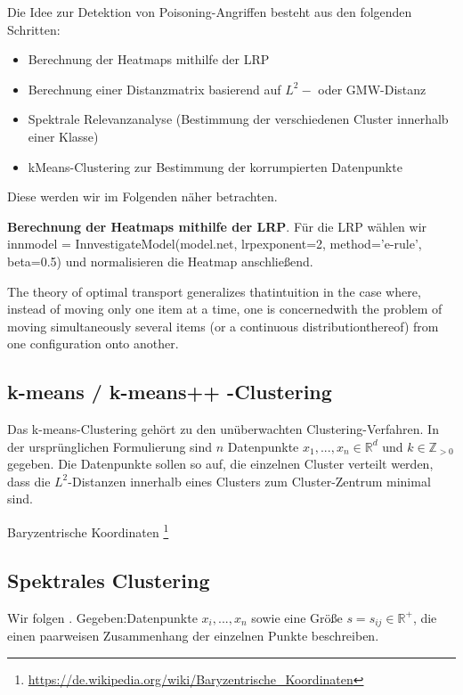 \documentclass[11pt,a4paper]{article}
\numberwithin{equation}{section}
\begin{document}
	Die Idee zur Detektion von Poisoning-Angriffen besteht aus den folgenden Schritten:
	
	\begin{itemize}
		\item Berechnung der Heatmaps mithilfe der LRP
		\item Berechnung einer Distanzmatrix basierend auf $L^2-$ oder GMW-Distanz
		\item Spektrale Relevanzanalyse (Bestimmung der verschiedenen Cluster innerhalb einer Klasse)
		\item kMeans-Clustering zur Bestimmung der korrumpierten Datenpunkte
	\end{itemize}

	Diese werden wir im Folgenden näher betrachten.
	
	\noindent\textbf{Berechnung der Heatmaps mithilfe der LRP}.	Für die LRP wählen wir innmodel = InnvestigateModel(model.net, lrpexponent=2,
	method='e-rule', beta=0.5) und normalisieren die Heatmap anschließend.
	
	
	
	The theory of optimal transport generalizes thatintuition in the case where, instead of moving only one item at a time, one is concernedwith the problem of moving simultaneously several items (or a continuous distributionthereof) from one configuration onto another.\cite{computationalOT}
	\subsection{k-means / k-means++ -Clustering}
	Das k-means-Clustering gehört zu den unüberwachten Clustering-Verfahren. In der ursprünglichen Formulierung sind $n$ Datenpunkte $x_1,...,x_n \in \mathbb{R}^d$ und $k \in \mathbb{Z}_{>0}$ gegeben. Die Datenpunkte sollen so auf, die einzelnen Cluster verteilt werden, dass die $L^2$-Distanzen innerhalb eines Clusters zum Cluster-Zentrum minimal sind. 
	
	
	


	Baryzentrische Koordinaten \footnote{\url{https://de.wikipedia.org/wiki/Baryzentrische_Koordinaten}}
	
	\subsection{Spektrales Clustering}
	Wir folgen \cite{spectralClustering_tut}.
	Gegeben:Datenpunkte $x_i, ..., x_n$ sowie eine Größe $s = s_{ij} \in \mathbb{R}^{+}$, die einen paarweisen Zusammenhang der einzelnen Punkte beschreiben.
	
\end{document}
